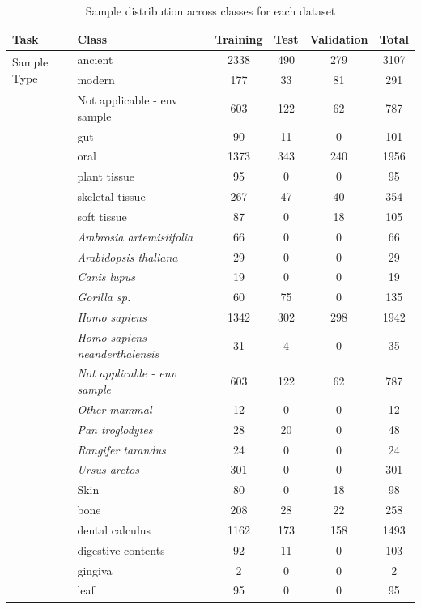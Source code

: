 \begin{table}[!t]
\caption{Sample distribution across classes for each dataset\label{tab:class_distribution}}
\begin{tabular*}{\textwidth}{@{\extracolsep{\fill}}llcccc@{\extracolsep{\fill}}}
\toprule
Task & Class & Training & Test & Validation & Total \\
\midrule
\multirow{2}{*}{Sample Type} & ancient & 2338 & 490 & 279 & 3107 \\
 & modern & 177 & 33 & 81 & 291 \\
\addlinespace
\multirow{6}{*}{Community Type} & Not applicable - env sample & 603 & 122 & 62 & 787 \\
 & gut & 90 & 11 & 0 & 101 \\
 & oral & 1373 & 343 & 240 & 1956 \\
 & plant tissue & 95 & 0 & 0 & 95 \\
 & skeletal tissue & 267 & 47 & 40 & 354 \\
 & soft tissue & 87 & 0 & 18 & 105 \\
\addlinespace
\multirow{11}{*}{Sample Host} & \textit{Ambrosia artemisiifolia} & 66 & 0 & 0 & 66 \\
 & \textit{Arabidopsis thaliana} & 29 & 0 & 0 & 29 \\
 & \textit{Canis lupus} & 19 & 0 & 0 & 19 \\
 & \textit{Gorilla sp.} & 60 & 75 & 0 & 135 \\
 & \textit{Homo sapiens} & 1342 & 302 & 298 & 1942 \\
 & \textit{Homo sapiens neanderthalensis} & 31 & 4 & 0 & 35 \\
 & \textit{Not applicable - env sample} & 603 & 122 & 62 & 787 \\
 & \textit{Other mammal} & 12 & 0 & 0 & 12 \\
 & \textit{Pan troglodytes} & 28 & 20 & 0 & 48 \\
 & \textit{Rangifer tarandus} & 24 & 0 & 0 & 24 \\
 & \textit{Ursus arctos} & 301 & 0 & 0 & 301 \\
\addlinespace
\multirow{17}{*}{Material} & Skin & 80 & 0 & 18 & 98 \\
 & bone & 208 & 28 & 22 & 258 \\
 & dental calculus & 1162 & 173 & 158 & 1493 \\
 & digestive contents & 92 & 11 & 0 & 103 \\
 & gingiva & 2 & 0 & 0 & 2 \\
 & leaf & 95 & 0 & 0 & 95 \\

\end{tabular*}
\end{table}

